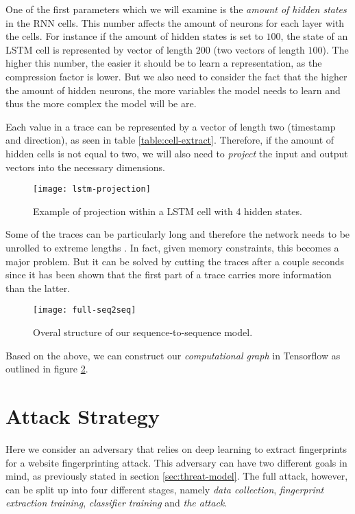 One of the first parameters which we will examine is the \textit{amount of hidden states} in the RNN cells.
This number affects the amount of neurons for each layer with the cells.
For instance if the amount of hidden states is set to $100$, the state of an LSTM cell is represented by vector of length $200$ (two vectors of length $100$).
The higher this number, the easier it should be to learn a representation, as the compression factor is lower.
But we also need to consider the fact that the higher the amount of hidden neurons, the more variables the model needs to learn and thus the more complex the model will be are.

Each value in a trace can be represented by a vector of length two (timestamp and direction), as seen in table \ref{table:cell-extract}.
Therefore, if the amount of hidden cells is not equal to two, we will also need to \textit{project} the input and output vectors into the necessary dimensions.

\begin{figure}[ht]
  \centering
  \texttt{[image: lstm-projection]}
  \caption{Example of projection within a LSTM cell with 4 hidden states.}
  \label{fig:lstm-projection}
\end{figure}

\newpage

Some of the traces can be particularly long and therefore the network needs to be unrolled to extreme lengths \cite{greschbach2016effect}.
In fact, given memory constraints, this becomes a major problem.
But it can be solved by cutting the traces after a couple seconds since it has been shown that the first part of a trace carries more information than the latter.

\begin{figure}[ht]
  \centering
  \texttt{[image: full-seq2seq]}
  \caption{Overal structure of our sequence-to-sequence model.}
  \label{fig:full-seq2seq}
\end{figure}

Based on the above, we can construct our \textit{computational graph} in Tensorflow as outlined in figure \ref{fig:full-seq2seq}.

\section{Attack Strategy}

Here we consider an adversary that relies on deep learning to extract fingerprints for a website fingerprinting attack.
This adversary can have two different goals in mind, as previously stated in section \ref{sec:threat-model}.
The full attack, however, can be split up into four different stages, namely \textit{data collection}, \textit{fingerprint extraction training}, \textit{classifier training} and \textit{the attack}.

